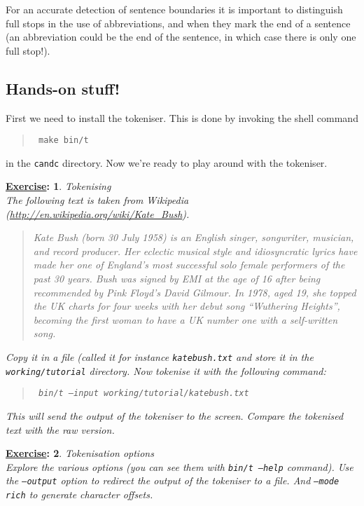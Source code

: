 \documentclass[11pt]{article}
\newtheorem{exercisebb}{\textbf{\underline{Exercise}:}}[section]
\newcommand{\bx}[1]{\begin{exercisebb} \rm #1\\}
\newcommand{\ex}{\end{exercisebb}}
\begin{document}
For an accurate detection of sentence boundaries it is important to
distinguish full stops in the use of abbreviations, and when they mark
the end of a sentence (an abbreviation could be the end of the
sentence, in which case there is only one full stop!).


\subsection*{Hands-on stuff!}

First we need to install the tokeniser. This is done by invoking the shell command

\begin{quote}\tt
make bin/t
\end{quote}

in the \texttt{candc} directory. Now we're ready to play around with the tokeniser.


\bx{Tokenising} The following text is taken from Wikipedia
(\url{http://en.wikipedia.org/wiki/Kate_Bush}).  

\begin{quote}
Kate Bush (born 30 July 1958) is an English singer, songwriter, musician, and record producer. Her eclectic musical style and idiosyncratic lyrics have made her one of England's most successful solo female
performers of the past 30 years. Bush was signed by EMI at the age of 16 after being recommended by Pink Floyd's David Gilmour. In 1978, aged 19, she topped the UK charts for four weeks with her debut song
``Wuthering Heights'', becoming the first woman to have a UK number one with a self-written song.
\end{quote}

Copy it in a file
(called it for instance \texttt{katebush.txt} and store it in the
\texttt{working/tutorial} directory. Now tokenise it with the following command:

\begin{quote}\tt 
bin/t --input working/tutorial/katebush.txt
\end{quote}

This will send the output of the tokeniser to the screen. Compare the tokenised text with the
raw version.
\ex

\bx{Tokenisation options} 
Explore the various options (you can see
them with \texttt{bin/t --help} command).  Use the \texttt{--output}
option to redirect the output of the tokeniser to a file. And
\texttt{--mode rich} to generate character offsets.  
\ex

%
%
\clearpage
\end{document}
